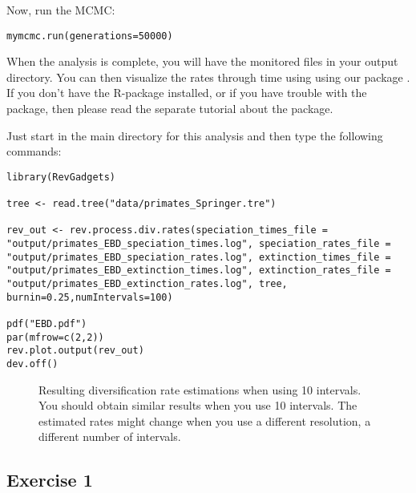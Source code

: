 Now, run the MCMC:
{\tt \begin{snugshade*}
\begin{lstlisting}
mymcmc.run(generations=50000)
\end{lstlisting}
\end{snugshade*}}

When the analysis is complete, you will have the monitored files in your output directory.
You can then visualize the rates through time using \R using our package \RevGadgets.
If you don't have the R-package \RevGadgets installed, or if you have trouble with the package, then please read the separate tutorial about the package.

Just start \R in the main directory for this analysis and then type the following commands:
{\tt \begin{snugshade*}
\begin{lstlisting}
library(RevGadgets)

tree <- read.tree("data/primates_Springer.tre")

rev_out <- rev.process.div.rates(speciation_times_file = "output/primates_EBD_speciation_times.log", speciation_rates_file = "output/primates_EBD_speciation_rates.log", extinction_times_file = "output/primates_EBD_extinction_times.log", extinction_rates_file = "output/primates_EBD_extinction_rates.log", tree, burnin=0.25,numIntervals=100)

pdf("EBD.pdf")
par(mfrow=c(2,2))
rev.plot.output(rev_out)
dev.off()
\end{lstlisting}
\end{snugshade*}}


\begin{figure}[h!]
\centering
{}
\caption{\small Resulting diversification rate estimations when using 10 intervals. You should obtain similar results when you use 10 intervals. The estimated rates might change when you use a different resolution, \IE a different number of intervals.}
\label{fig:EBD_Results}
\end{figure}

\subsection{Exercise 1}

